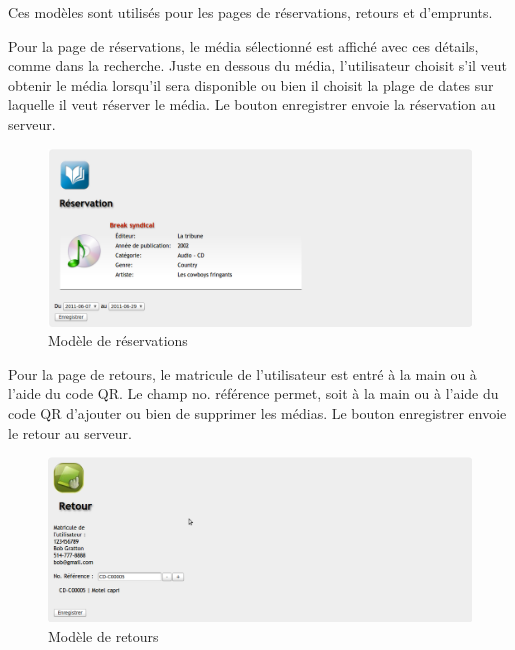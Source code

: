 \documentclass[letter, 11pt]{report}
\begin{document}
Ces modèles sont utilisés pour les pages de réservations, retours et d'emprunts. 

Pour la page de réservations, le média sélectionné est affiché avec ces détails, comme dans la recherche. Juste en dessous du média, l'utilisateur choisit s'il veut obtenir le média lorsqu'il sera disponible ou bien il choisit la plage de dates sur laquelle il veut réserver le média. Le bouton enregistrer envoie la réservation au serveur.

\begin{figure}[htbp]
	\begin{center}
		\includegraphics[scale=0.4]{captures_ecran/reservation.png}
	\end{center}
	\caption{Modèle de réservations}
\end{figure}

Pour la page de retours, le matricule de l'utilisateur est entré à la main ou à l'aide du code QR. Le champ no. référence permet, soit à la main ou à l'aide du code QR d'ajouter ou bien de supprimer les médias. Le bouton enregistrer envoie le retour au serveur.

\begin{figure}[htbp]
	\begin{center}
		\includegraphics[scale=0.5]{captures_ecran/retour.png}
	\end{center}
	\caption{Modèle de retours}
\end{figure}
\end{document}
